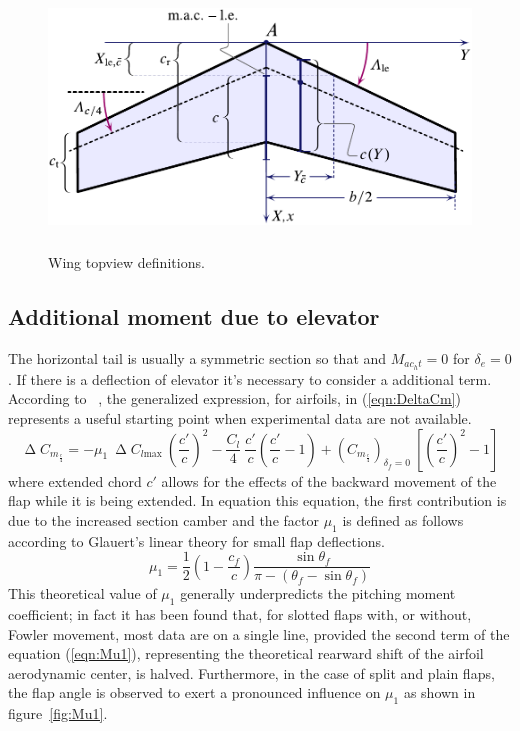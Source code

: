 \begin{figure}[H]
\centering
\includegraphics[height=7cm]{Immagini/wing_topview_1_new}
\caption{Wing topview definitions.}
\label{wing}
\end{figure}


\subsection{Additional moment due to elevator}
The horizontal tail is usually a symmetric section so that and $M_{ac_ht} = 0$ for $\delta_e = 0$. If there is a deflection of elevator it's necessary to consider a additional term. According to ~\cite{torenbeek1982synthesis}, the generalized expression, for airfoils, in (\ref{eqn:DeltaCm}) represents a useful starting point when experimental data are not available.
%
\begin{equation}
\upDelta C_{m_{\frac{c}{4}}}=-\mu_1\ \upDelta C_{l\text{max}}\ \left(\dfrac{c'}{c}\right)^2-\dfrac{C_l}{4}\ \dfrac{c'}{c}\left(\dfrac{c'}{c}-1\right)+\left(C_{m_{\frac{c}{4}}}\right)_{\delta_f=0}\ \left[\left(\dfrac{c'}{c}\right)^2-1\right]
\label{eqn:DeltaCm}
\end{equation}
%
where extended chord $c'$ allows for the effects of the backward movement of the flap while it is being extended.
%
In equation this equation, the first contribution is due to the increased section camber and the factor $\mu_1$ is defined as follows according to Glauert's linear theory for small flap deflections.
%
\begin{equation}
\mu_1=\dfrac{1}{2}\left(1-\dfrac{c_f}{c}\right)\dfrac{\sin\theta_f}{\pi-\left(\theta_f-\sin\theta_f\right)}
\label{eqn:Mu1}
\end{equation}
%
This theoretical value of $\mu_1$ generally underpredicts the pitching moment coefficient; in fact it has been found that, for slotted flaps with, or without, Fowler movement, most data are on a single line, provided the second term of the equation (\ref{eqn:Mu1}), representing the theoretical rearward shift of the airfoil aerodynamic center, is halved. Furthermore, in the case of split and plain flaps, the flap angle is observed to exert a pronounced influence on $\mu_1$ as shown in figure~\ref{fig:Mu1}.

